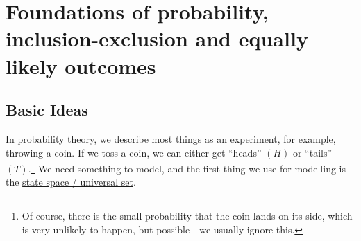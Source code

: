 \section{Foundations of probability, inclusion-exclusion and equally likely outcomes}

\subsection{Basic Ideas}
In probability theory, we describe most things as an experiment, for example, throwing a coin. If we toss a coin, we can either get ``heads'' $(H)$ or ``tails'' $(T)$.\footnote{Of course, there is the small probability that the coin lands on its side, which is very unlikely to happen, but possible - we usually ignore this.} We need something to model, and the first thing we use for modelling is the \ul{state space / universal set}. 

